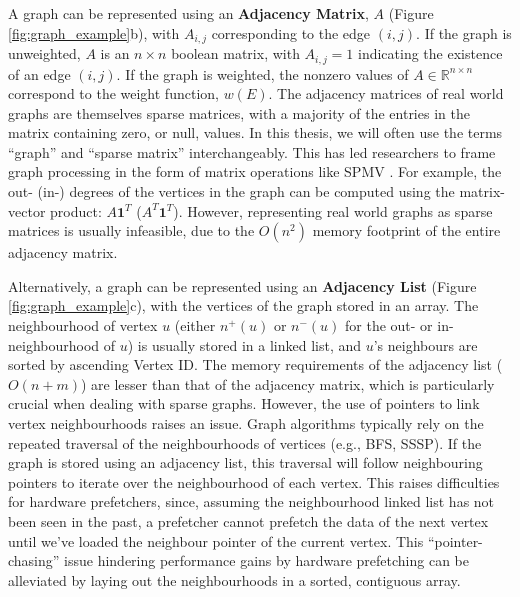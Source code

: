 A graph can be represented using an \textbf{Adjacency Matrix}, $A$ (Figure \ref{fig:graph_example}b), with $A_{i,j}$ corresponding to the edge $(i, j)$. If the graph is unweighted, $A$ is an $n\times n$ boolean matrix, with $A_{i,j} = 1$ indicating the existence of an edge $(i, j)$.
If the graph is weighted, the nonzero values of $A\in\mathbb{R}^{n\times n}$ correspond to the weight function, $w(E)$. The adjacency matrices of real world graphs are themselves sparse matrices, with a majority of the entries in the matrix containing zero, or null, values. In this thesis, we will often use the terms ``graph'' and ``sparse matrix'' interchangeably. This has led researchers to frame graph processing in the form of matrix operations like \ac{SPMV} \cite{graphmat}. For example, the out- (in-) degrees of the vertices in the graph can be computed using the matrix-vector product: $A\mathbf{1}^T$ ($A^T\mathbf{1}^T$). However, representing real world graphs as sparse matrices is usually infeasible, due to the $O(n^2)$ memory footprint of the entire adjacency matrix.

Alternatively, a graph can be represented using an \textbf{Adjacency List} (Figure \ref{fig:graph_example}c), with the vertices of the graph stored in an array.
The neighbourhood of vertex $u$ (either $n^{+}(u)$ or $n^{-}(u)$ for the out- or in-neighbourhood of $u$) is usually stored in a linked list, and $u$'s neighbours are sorted by ascending Vertex ID. The memory requirements of the adjacency list ($O(n + m)$) are lesser than that of the adjacency matrix, which is particularly crucial when dealing with sparse graphs. However, the use of pointers to link vertex neighbourhoods raises an issue.
Graph algorithms typically rely on the repeated traversal of the neighbourhoods of vertices (e.g., \ac{BFS}, \ac{SSSP}). If the graph is stored using an adjacency list, this traversal will follow neighbouring pointers to iterate over the neighbourhood of each vertex. This raises difficulties for hardware prefetchers, since, assuming the neighbourhood linked list has not been seen in the past, a prefetcher cannot prefetch the data of the next vertex until we've loaded the neighbour pointer of the current vertex. This ``pointer-chasing'' issue hindering performance gains by hardware prefetching can be alleviated by laying out the neighbourhoods in a sorted, contiguous array.

